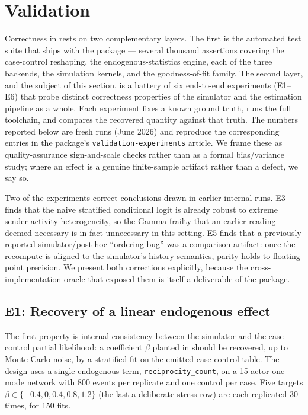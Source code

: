 \section{Validation}
\label{sec:validation}

Correctness in  rests on two complementary layers. The first is
the automated test suite that ships with the package --- several thousand
assertions covering the case-control reshaping, the
endogenous-statistics engine, each of the three  backends, the
simulation kernels, and the goodness-of-fit family. The second layer, and
the subject of this section, is a battery of six end-to-end experiments
(E1--E6) that probe distinct correctness properties of the simulator and the
estimation pipeline as a whole. Each experiment fixes a known ground truth,
runs the full toolchain, and compares the recovered quantity against that
truth. The numbers reported below are fresh runs (June 2026) and reproduce
the corresponding entries in the package's \texttt{validation-experiments}
article. We frame these as quality-assurance sign-and-scale checks rather
than as a formal bias/variance study; where an effect is a genuine
finite-sample artifact rather than a defect, we say so.

Two of the experiments correct conclusions drawn in earlier internal runs.
E3 finds that the naive stratified conditional logit is already robust to
extreme sender-activity heterogeneity, so the Gamma frailty that an earlier
reading deemed necessary is in fact unnecessary in this setting. E5 finds
that a previously reported simulator/post-hoc ``ordering bug'' was a
comparison artifact: once the recompute is aligned to the simulator's
history semantics, parity holds to floating-point precision. We present both
corrections explicitly, because the cross-implementation oracle that exposed
them is itself a deliverable of the package.

\subsection{E1: Recovery of a linear endogenous effect}
\label{sec:val-e1}

The first property is internal consistency between the simulator and the
case-control partial likelihood: a coefficient $\beta$ planted in
 should be recovered, up to Monte Carlo
noise, by a stratified  fit on the emitted case-control table.
The design uses a single endogenous term, \texttt{reciprocity\_count}, on a
15-actor one-mode network with 800 events per replicate and one control per
case. Five targets $\beta \in \{-0.4, 0, 0.4, 0.8, 1.2\}$ (the last a
deliberate stress row) are each replicated 30 times, for 150 fits.

